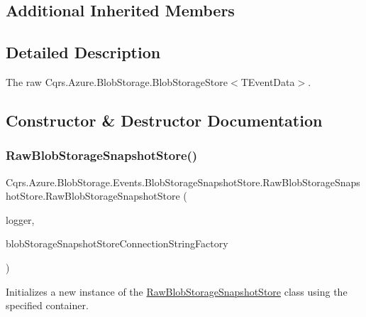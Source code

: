 \subsection*{Additional Inherited Members}


\subsection{Detailed Description}
The raw Cqrs.\+Azure.\+Blob\+Storage.\+Blob\+Storage\+Store$<$\+T\+Event\+Data$>$. 



\subsection{Constructor \& Destructor Documentation}
\mbox{\label{classCqrs_1_1Azure_1_1BlobStorage_1_1Events_1_1BlobStorageSnapshotStore_1_1RawBlobStorageSnapshotStore_a77ba6a483bad41429e0331a75bc68856_a77ba6a483bad41429e0331a75bc68856}} 
\subsubsection{\texorpdfstring{Raw\+Blob\+Storage\+Snapshot\+Store()}{RawBlobStorageSnapshotStore()}}
{\footnotesize\ttfamily Cqrs.\+Azure.\+Blob\+Storage.\+Events.\+Blob\+Storage\+Snapshot\+Store.\+Raw\+Blob\+Storage\+Snapshot\+Store.\+Raw\+Blob\+Storage\+Snapshot\+Store (\begin{DoxyParamCaption}\item[{I\+Logger}]{logger,  }\item[{\hyperlink{interfaceCqrs_1_1Azure_1_1BlobStorage_1_1IBlobStorageSnapshotStoreConnectionStringFactory}{I\+Blob\+Storage\+Snapshot\+Store\+Connection\+String\+Factory}}]{blob\+Storage\+Snapshot\+Store\+Connection\+String\+Factory }\end{DoxyParamCaption})}



Initializes a new instance of the \hyperlink{classCqrs_1_1Azure_1_1BlobStorage_1_1Events_1_1BlobStorageSnapshotStore_1_1RawBlobStorageSnapshotStore}{Raw\+Blob\+Storage\+Snapshot\+Store} class using the specified container. 

